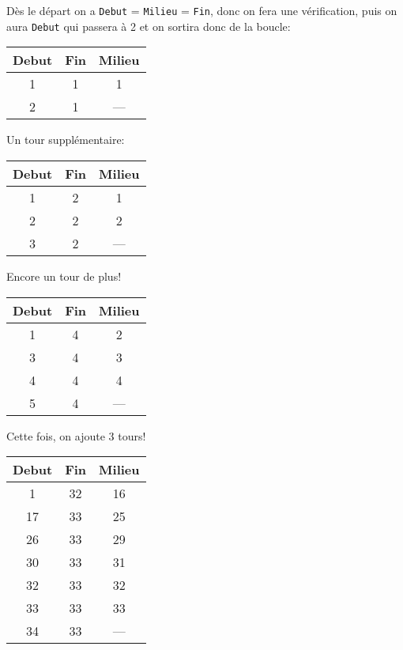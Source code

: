 \documentclass[12pt]{article}
\begin{document}
	\begin{MaReponse}
		\begin{alphenum}
			\item Dès le départ on a \texttt{Debut} = \texttt{Milieu} = \texttt{Fin}, donc on fera une vérification, puis on aura \texttt{Debut} qui passera à 2 et on sortira donc de la boucle:
			
			\begin{tabular}{|c|c|c|}
				\hline
				\textbf{Debut} & \textbf{Fin} & \textbf{Milieu} \\
				\hline
				1 & 1 & 1 \\
				\hline 
				2 & 1 & --- \\
				\hline
			\end{tabular}
			\vspace{\baselineskip}
			\item Un tour supplémentaire:
			
			\begin{tabular}{|c|c|c|}
				\hline
				\textbf{Debut} & \textbf{Fin} & \textbf{Milieu} \\
				\hline
				1 & 2 & 1 \\
				\hline 
				2 & 2 & 2 \\
				\hline 
				3 & 2 & --- \\
				\hline
			\end{tabular}
			\vspace{\baselineskip}
			\item Encore un tour de plus!
			
			\begin{tabular}{|c|c|c|}
				\hline
				\textbf{Debut} & \textbf{Fin} & \textbf{Milieu} \\
				\hline
				1 & 4 & 2 \\
				\hline 
				3 & 4 & 3 \\
				\hline 
				4 & 4 & 4 \\
				\hline 
				5 & 4 & --- \\
				\hline
			\end{tabular}
			\vspace{\baselineskip}
			\item Cette fois, on ajoute 3 tours!
			
			\begin{tabular}{|c|c|c|}
				\hline
				\textbf{Debut} & \textbf{Fin} & \textbf{Milieu} \\
				\hline
				1 & 32 & 16 \\
				\hline 
				17 & 33 & 25 \\
				\hline 
				26 & 33 & 29 \\
				\hline 
				30 & 33 & 31 \\
				\hline 
				32 & 33 & 32 \\
				\hline 
				33 & 33 & 33 \\
				\hline 
				34 & 33 & --- \\
				\hline
			\end{tabular}
			

\end{alphenum}
\end{MaReponse}
\end{document}
